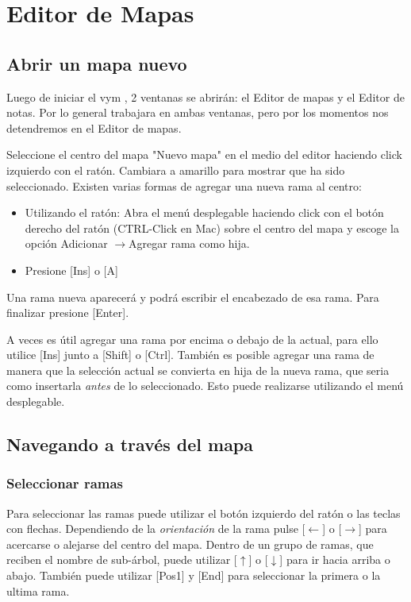 \documentclass{article}
\newcommand{\vym}{{\sc vym }}
\newcommand{\ra}{$\longrightarrow$}
\newcommand{\la}{$\longleftarrow$}
\newcommand{\ua}{$\uparrow$}
\newcommand{\da}{$\downarrow$}
\newcommand{\key}[1]{[#1]}
\begin{document}
\section{Editor de Mapas} \label {mapeditor}
\subsection{Abrir un mapa nuevo}
Luego de iniciar el \vym, 2 ventanas se abrir\'an: el Editor de mapas y el Editor de notas. Por lo general trabajara en ambas ventanas, pero por los momentos nos detendremos en el Editor de mapas.

Seleccione el centro del mapa "Nuevo mapa" en el medio del editor haciendo click izquierdo con el rat\'on. Cambiara a amarillo para mostrar que ha sido seleccionado. Existen varias formas de agregar una nueva rama al centro:
\begin{itemize}
    \item Utilizando el rat\'on: Abra el men\'u desplegable haciendo click con el bot\'on derecho del rat\'on (CTRL-Click en Mac) sobre el centro del mapa y escoge la opci\'on Adicionar \ra Agregar rama como hija. 
    \item Presione \key{Ins} o \key{A}
\end{itemize}
Una rama nueva aparecer\'a y podr\'a escribir el encabezado de esa rama. Para finalizar presione \key{Enter}.

A veces es \'util agregar una rama por encima o debajo de la actual, para ello utilice \key{Ins} junto a \key{Shift} o \key{Ctrl}. Tambi\'en es posible agregar una rama de manera que la selecci\'on actual se convierta en hija de la nueva rama, que seria como insertarla {\em antes} de lo seleccionado. Esto puede realizarse utilizando el men\'u desplegable.

\subsection{Navegando a trav\'es del mapa}
\subsubsection*{Seleccionar ramas}

Para seleccionar las ramas puede utilizar el bot\'on izquierdo del rat\'on o las teclas con flechas. Dependiendo de la {\em orientaci\'on} de la rama pulse \key{\la} o \key{\ra} para acercarse o alejarse del centro del mapa. Dentro de un grupo de ramas, que reciben el nombre de sub-\'arbol, puede utilizar \key{\ua} o \key{\da} para ir hacia arriba o abajo. Tambi\'en puede utilizar \key{Pos1} y \key{End} para seleccionar la primera o la ultima rama.
\end{document}
